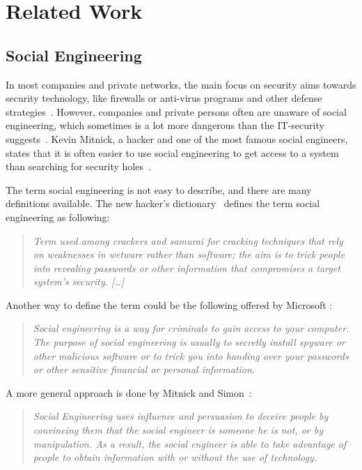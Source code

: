 \chapter{Related Work}
\label{chap:relatedwork}

\section{Social Engineering}

In most companies and private networks, the main focus on security aims towards
security technology, like firewalls or anti-virus programs and other defense
strategies~\cite{winkler1995}. However, companies and private persons often are unaware of social
engineering, which sometimes is a lot more dangerous than the IT-security
suggests~\cite{jones2004}. Kevin Mitnick, a hacker and one of the most famous social
engineers, states that it is often easier to use social engineering to get
access to a system than searching for security holes~\cite{mitnick2003}.

The term social engineering is not easy to describe, and there are many
definitions available. 
The new hacker's dictionary~\cite{raymond1996} defines the term social engineering as
following:
\begin{quote}
\textit{Term used among crackers and samurai for cracking techniques that rely on
weaknesses in wetware rather than software; the aim is to trick people into
revealing passwords or other information that compromises a target system's
security. [\dots]}
\end{quote}

Another way to define the term could be the following offered by Microsoft
\cite{microsoft2009}:
\begin{quote}
\textit{Social engineering is a way for criminals to gain access to your computer. The
purpose of social engineering is usually to secretly install spyware or other
malicious software or to trick you into handing over your passwords or other
sensitive financial or personal information.}
\end{quote}

A more general approach is done by Mitnick and Simon~\cite{mitnick2003}:
\begin{quote}
\textit{Social Engineering uses influence and persuasion to deceive people
by convincing them that the social engineer is someone he is not,
or by manipulation. As a result, the social engineer is able to take
advantage of people to obtain information with or without the use of
technology.}
\end{quote}

